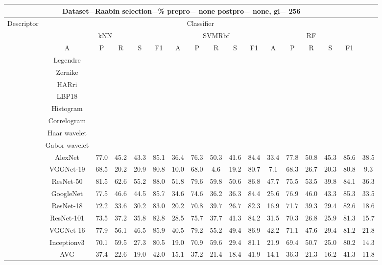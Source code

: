 \documentclass[12pt,italian]{article}
\begin{document}
\begin{tiny}
 \pagebreak 
\begin{longtable}{lcccccccccccccccc}
\toprule
\multicolumn{16}{c}{Dataset=Raabin selection=\% prepro= none postpro= none, gl= 256} \\ 
\toprule
Descriptor & \multicolumn{15}{c}{Classifier} \\ 
& \multicolumn{5}{c}{kNN} & \multicolumn{5}{c}{SVMRbf} & \multicolumn{5}{c}{RF} \\ 
& A & P & R & S & F1 & A & P & R & S & F1 & A & P & R & S & F1 \\ 
\midrule
& Legendre \\ 
& Zernike \\ 
& HARri \\ 
& LBP18 \\ 
& Histogram \\ 
& Correlogram \\ 
& Haar wavelet \\ 
& Gabor wavelet \\ 
& AlexNet & 77.0 & 45.2 & 43.3 & 85.1 & 36.4 & 76.3 & 50.3 & 41.6 & 84.4 & 33.4 & 77.8 & 50.8 & 45.3 & 85.6 & 38.5 \\ 
& VGGNet-19 & 68.5 & 20.2 & 20.9 & 80.8 & 10.0 & 68.0 &  4.6 & 19.2 & 80.7 &  7.1 & 68.3 & 26.7 & 20.3 & 80.8 &  9.3 \\ 
& ResNet-50 & 81.5 & 62.6 & 55.2 & 88.0 & 51.8 & 79.6 & 59.8 & 50.6 & 86.8 & 47.7 & 75.5 & 53.5 & 39.8 & 84.1 & 36.3 \\ 
& GoogleNet & 77.5 & 46.6 & 44.5 & 85.7 & 34.6 & 74.6 & 36.2 & 36.3 & 84.4 & 25.6 & 76.9 & 46.0 & 43.3 & 85.3 & 33.5 \\ 
& ResNet-18 & 72.2 & 33.6 & 30.2 & 83.0 & 20.2 & 70.8 & 39.7 & 26.7 & 82.3 & 16.9 & 71.7 & 39.3 & 29.4 & 82.6 & 18.6 \\ 
& ResNet-101 & 73.5 & 37.2 & 35.8 & 82.8 & 28.5 & 75.7 & 37.7 & 41.3 & 84.2 & 31.5 & 70.3 & 26.8 & 25.9 & 81.3 & 15.7 \\ 
& VGGNet-16 & 77.9 & 56.1 & 46.5 & 85.9 & 40.5 & 79.2 & 55.2 & 49.4 & 86.9 & 42.2 & 71.1 & 47.6 & 29.4 & 81.2 & 21.8 \\ 
& Inceptionv3 & 70.1 & 59.5 & 27.3 & 80.5 & 19.0 & 70.9 & 59.6 & 29.4 & 81.1 & 21.9 & 69.4 & 50.7 & 25.0 & 80.2 & 14.3 \\ 
\hline
& AVG & 37.4 & 22.6 & 19.0 & 42.0 & 15.1 & 37.2 & 21.4 & 18.4 & 41.9 & 14.1 & 36.3 & 21.3 & 16.2 & 41.3 & 11.8 \\ 
\hline
\bottomrule
\end{longtable} 

 \pagebreak 
\end{tiny} 
 
\end{document}
